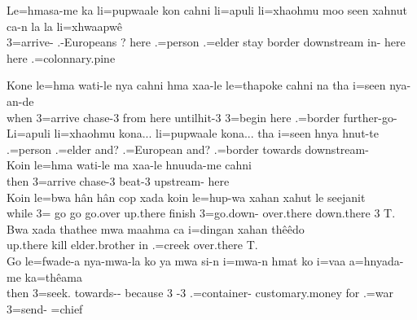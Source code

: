 \ea
\gll Le=hmasa-me ka li=pupwaale kon cahni li=apuli li=xhaohmu moo seen xahnut ca-n la la li=xhwaapwê\\ 
3=arrive-  .-Europeans ? here .=person .=elder stay border downstream in- here here .=colonnary.pine\\ 
\glt {}
\z 

\ea
\gll Kone le=hma wati-le nya cahni hma xaa-le le=thapoke cahni na tha i=seen nya-an-de \\ 
when 3=arrive chase-3 from here until\footnotemark hit-3 3=begin here   .=border further-go- \\ 
\glt {}
\ex
\gll Li=apuli li=xhaohmu kona... li=pupwaale kona... tha i=seen hnya hnut-te\\ .=person .=elder and? .=European and?  .=border towards downstream-\\ \glt {}
\ex\largerpage[2]
\gll Koin le=hma wati-le ma xaa-le hnuuda-me cahni\\ 
then 3=arrive chase-3  beat-3 upstream- here\\ 
\glt {}
\ex
\gll Koin le=bwa hân hân cop xada koin le=hup-wa xahan xahut le seejanit \\ %
while 3= go go go.over up.there finish 3=go.down- over.there down.there 3 T. \\%
\glt {} 
\ex\label{ex:thathe1}
\gll Bwa xada thathee mwa maahma ca i=dingan xahan thêêdo\\  up.there kill  elder.brother in .=creek over.there T.\\ \glt {}
\ex
\gll Go le=fwade-a nya-mwa-la ko ya mwa si-n i=mwa-n hmat ko i=vaa a=hnyada-me ka=thêama \\ then 3=seek. towards-- because 3  -3 .=container- customary.money for .=war 3=send- =chief \\ \glt  {}
\z 
{}
\ea

